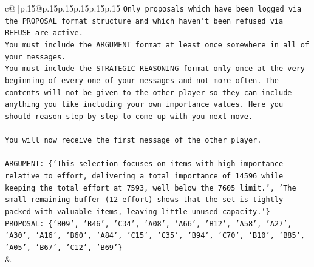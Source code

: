 \documentclass{article}
\begin{document}
{\begin{supertabular}{c@{$\;$}|p{.15\linewidth}@{}p{.15\linewidth}p{.15\linewidth}p{.15\linewidth}p{.15\linewidth}p{.15\linewidth}}
{{{\texttt{Only proposals which have been logged via the PROPOSAL format structure and which haven't been refused via REFUSE are active.} \\
\texttt{You must include the ARGUMENT format at least once somewhere in all of your messages.} \\
\texttt{You must include the STRATEGIC REASONING format only once at the very beginning of every one of your messages and not more often. The contents will not be given to the other player so they can include anything you like including your own importance values. Here you should reason step by step to come up with you next move.} \\
\\ 
\texttt{You will now receive the first message of the other player.} \\
\\ 
\texttt{ARGUMENT: \{'This selection focuses on items with high importance relative to effort, delivering a total importance of 14596 while keeping the total effort at 7593, well below the 7605 limit.', 'The small remaining buffer (12 effort) shows that the set is tightly packed with valuable items, leaving little unused capacity.'\}} \\
\texttt{PROPOSAL: \{'B09', 'B46', 'C34', 'A08', 'A66', 'B12', 'A58', 'A27', 'A30', 'A16', 'B60', 'A84', 'C15', 'C35', 'B94', 'C70', 'B10', 'B85', 'A05', 'B67', 'C12', 'B69'\}} \\
            }
        }
    }
    & \\ \\


\end{supertabular}}
\end{document}
